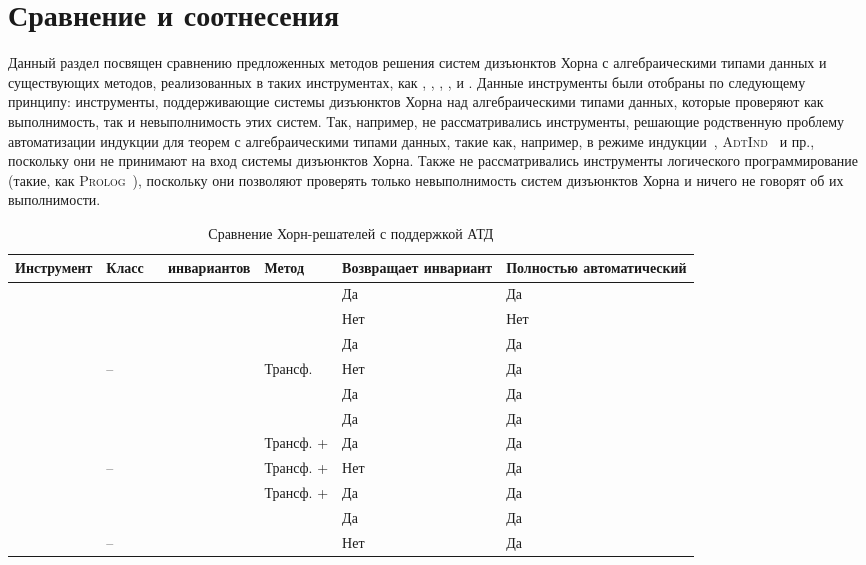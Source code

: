 \section{Сравнение и соотнесения}\label{ch:relatedWork}

Данный раздел посвящен сравнению предложенных методов решения систем дизъюнктов Хорна с алгебраическими типами данных и существующих методов, реализованных в таких инструментах, как \spacer{}, \racer{}, \eldarica{}, \vericat{}, \hoice{} и \rchc{}. Данные инструменты были отобраны по следующему принципу: инструменты, поддерживающие системы дизъюнктов Хорна над алгебраическими типами данных, которые проверяют как выполнимость, так и невыполнимость этих систем. Так, например, не рассматривались инструменты, решающие родственную проблему автоматизации индукции для теорем с алгебраическими типами данных, такие как, например, \cvc{} в режиме индукции~\cite{reynolds2015induction}, \textsc{AdtInd}~\cite{10.1007/978-3-030-30048-7_35} и пр., поскольку они не принимают на вход системы дизъюнктов Хорна. Также не рассматривались инструменты логического программирование (такие, как \textsc{Prolog}~\cite{ClocksinMellish03}), поскольку они позволяют проверять только невыполнимость систем дизъюнктов Хорна и ничего не говорят об их выполнимости.

\begin{table} [htbp]
    \centering\small
    \begin{threeparttable}%
        \caption{Сравнение Хорн-решателей с поддержкой АТД}\label{tab:hornSolvers}%
        \begin{tabular}{| m{50mm} || x{25mm} | x{25mm} | x{25mm} | x{25mm} |}
            \hline
            \hline
Инструмент & Класс\quad\ \ \  инвариантов & Метод & Возвращает инвариант & Полностью автоматический\\\hline\hline
\spacer{} & \elemclass{} & \pdr{} & Да & Да\\
\racer{} & \catelemclass{} & \pdr{} & Нет & Нет\\
\eldarica{} & \sizeelemclass{} & \cegar{} & Да & Да\\
\vericat{} & -- & Трансф. & Нет & Да\\
\hoice{} & \elemclass{} & \ice{} & Да & Да\\
\rchc{}  & \syncRegFlatClass{} & \ice{} & Да & Да\\\hline
\ringen{\cvc} & \regclass{} & Трансф. + \fmf{} & Да & Да\\
\ringen{\vampire} & -- & Трансф. + \satur{} & Нет & Да\\
\ringenSync{} & \syncRegFullClass{} & Трансф. + \fmf{} & Да & Да\\
\ringenCICI{\cvc} & \regelemclass{} & \ourCEGAR{} & Да & Да\\
\ringenCICI{\vampire} & -- & \ourCEGAR{} & Нет & Да\\
            \hline
            \hline
        \end{tabular}
    \end{threeparttable}
\end{table}

